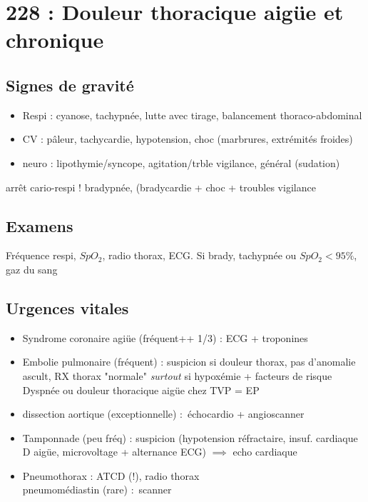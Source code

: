 \appendix
\section{228 : Douleur thoracique aigüe et chronique}%
\label{sec:228_douleur_thoracique_aigue_et_chronique}

\subsection{Signes de gravité}
\begin{itemize}
  \item Respi : cyanose, tachypnée, lutte avec tirage, balancement thoraco-abdominal
  \item CV : pâleur, tachycardie, hypotension, choc (marbrures, extrémités
    froides)
  \item neuro : lipothymie/syncope, agitation/trble vigilance, général (sudation)
\end{itemize}

\danger arrêt cario-respi ! bradypnée, (bradycardie + choc + troubles vigilance

\subsection{Examens}
Fréquence respi, $SpO_2$, radio thorax, ECG.
Si {brady, tachy}pnée ou $SpO_2 < 95\%$, gaz du sang

\subsection{Urgences vitales}
\begin{itemize}
  \item Syndrome coronaire agiüe (fréquent++ 1/3) : ECG + troponines
  \item Embolie pulmonaire (fréquent) : suspicion si douleur thorax, pas
    d'anomalie ascult, RX thorax "normale" \textit{surtout}  si hypoxémie +
    facteurs de risque\\
    Dyspnée ou douleur thoracique aigüe chez TVP = EP
  \item dissection aortique (exceptionnelle) : échocardio + angioscanner
  \item Tamponnade (peu fréq) : suspicion (hypotension réfractaire, insuf.
    cardiaque D aigüe, microvoltage + alternance ECG) $\implies$ echo cardiaque
  \item Pneumothorax : ATCD (!), radio thorax \\
    pneumomédiastin (rare) : scanner
\end{itemize}

